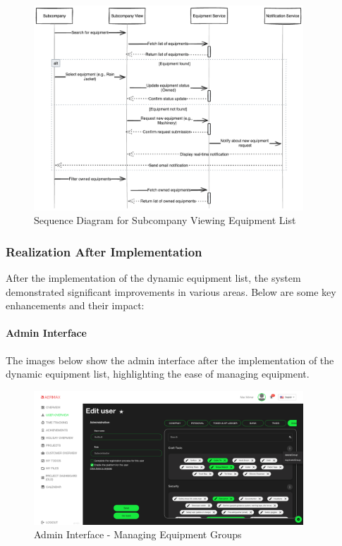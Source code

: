 \begin{figure}[H]
    \centering
    \includegraphics[width=0.9\textwidth]{src/assets/diagrams/SubcompanyEquipement.png}
    \caption{Sequence Diagram for Subcompany Viewing Equipment List}
    \label{fig:sequence_diagram_subcompany}
\end{figure}
\subsubsection{Realization After Implementation}
After the implementation of the dynamic equipment list, the system demonstrated significant improvements in various areas. Below are some key enhancements and their impact:

\paragraph{Admin Interface}
The images below show the admin interface after the implementation of the dynamic equipment list, highlighting the ease of managing equipment.

\begin{figure}[H]
    \centering
    \includegraphics[width=0.9\textwidth]{src/assets/images/admin1.png}
    \caption{Admin Interface - Managing Equipment Groups}
    \label{fig:admin_interface_1}
\end{figure}

